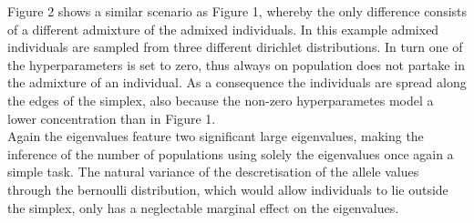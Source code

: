 \documentclass[a4paper, 11pt]{article}
\begin{document}
Figure 2 shows a similar scenario as Figure 1, whereby the only difference consists of a different admixture of the admixed individuals. In this example admixed individuals are sampled from three different dirichlet distributions. In turn one of the hyperparameters is set to zero, thus always on population does not partake in the admixture of an individual. As a consequence the individuals are spread along the edges of the simplex, also because the non-zero hyperparametes model a lower concentration than in Figure 1. \\
Again the eigenvalues feature two significant large eigenvalues, making the inference of the number of populations using solely the eigenvalues once again a simple task. The natural variance of the descretisation of the allele values through the bernoulli distribution, which would allow individuals to lie outside the simplex, only has a neglectable marginal effect on the eigenvalues.
\end{document}
